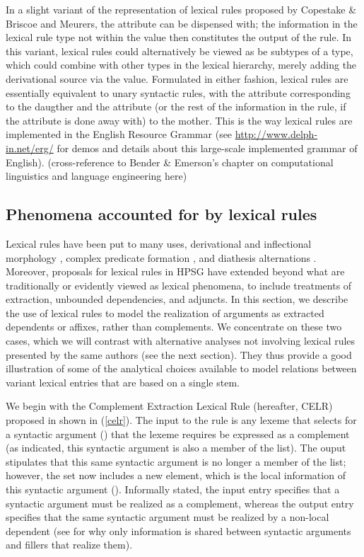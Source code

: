 \documentclass[output=paper]{langsci/langscibook}
\begin{document}
In a slight variant of the representation of lexical rules proposed by Copestake \& Briscoe and Meurers, the  attribute can be dispensed with; the information in the lexical rule type not within the  value then constitutes the output of the rule.
In this variant, lexical rules could alternatively be viewed as be subtypes of a  type, which could combine with other types in the lexical hierarchy, merely adding the derivational source via the  value. 
Formulated in either fashion, lexical rules are essentially equivalent to unary syntactic rules, with the  attribute corresponding to the daugther and the  attribute (or the rest of the information in the rule, if the  attribute is done away with) to the mother. This is the way lexical rules are implemented in the English Resource Grammar (see \url{http://www.delph-in.net/erg/} for demos and details about this large-scale implemented grammar of English). (cross-reference to Bender \& Emerson's chapter on computational linguistics and language engineering here)


\subsection{Phenomena accounted for by lexical rules}

Lexical rules have been put to many uses, derivational and inflectional morphology \citep{CopestakeandBriscoe1995,EmersonandCopestake2015}, complex predicate formation \citep{MuellerPersian}, and diathesis alternations \citep{Davis2001}. Moreover, proposals for lexical rules in HPSG have extended beyond what are traditionally or evidently viewed as lexical phenomena, to include treatments of extraction, unbounded dependencies, and adjuncts. In this section, we describe the use of lexical rules to model the realization of arguments as extracted dependents or affixes, rather than complements. We concentrate on these two cases, which we will contrast with alternative analyses not involving lexical rules presented by the same authors (see the next section). They thus provide a good illustration of some of the analytical choices available to model relations between variant lexical entries that are based on a single stem. 


We begin with the Complement Extraction Lexical Rule (hereafter, CELR) proposed in  shown in (\ref{celr}). The input to the rule is any lexeme that selects for a syntactic argument () that the lexeme requires be expressed as a complement (as indicated, this syntactic argument is also a member of the  list). The ouput stipulates that this same syntactic argument is no longer a member of the  list; however, the  set now includes a new element, which is the local information of this syntactic argument (). Informally stated, the input entry specifies that a syntactic argument must be realized as a complement, whereas the output entry specifies that the same syntactic argument must be realized by a non-local dependent (see \citet{PollardandSag1994} for why only  information is shared between syntactic arguments and fillers that realize them).
\end{document}
